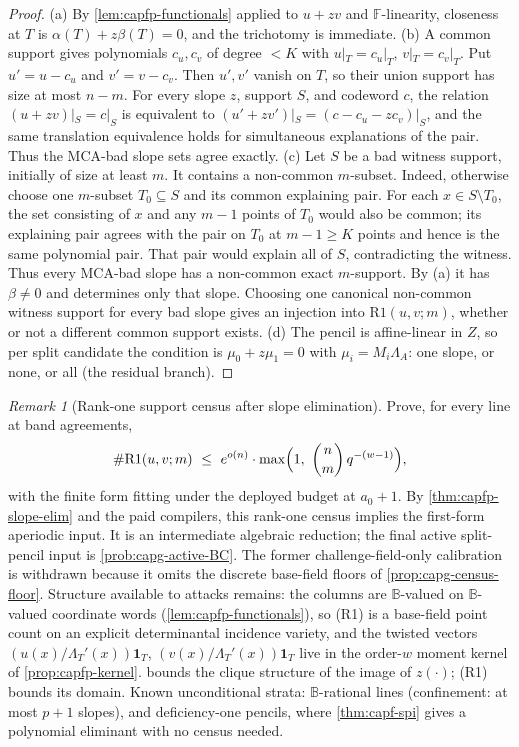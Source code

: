\documentclass[11pt]{article}
\theoremstyle{definition}
\theoremstyle{remark}
\newtheorem{remark}[remark]{Remark}
\newcommand{\F}{\mathbb{F}}
\newcommand{\B}{\mathbb{B}}
\begin{document}
\begin{proof}
\textup{(a)}  By \cref{lem:capfp-functionals} applied to $u+zv$ and $\F$-linearity, closeness at $T$ is $\alpha(T)+z\beta(T)=0$, and the trichotomy is immediate.
\textup{(b)}  A common support gives polynomials $c_u,c_v$ of degree $<K$ with $u|_T=c_u|_T$, $v|_T=c_v|_T$.  Put $u'=u-c_u$ and $v'=v-c_v$.  Then $u',v'$ vanish on $T$, so their union support has size at most $n-m$.  For every slope $z$, support $S$, and codeword $c$, the relation $(u+zv)|_S=c|_S$ is equivalent to $(u'+zv')|_S=(c-c_u-zc_v)|_S$, and the same translation equivalence holds for simultaneous explanations of the pair.  Thus the MCA-bad slope sets agree exactly.
\textup{(c)}  Let $S$ be a bad witness support, initially of size at least
$m$.  It contains a non-common $m$-subset.  Indeed, otherwise choose one
$m$-subset $T_0\subseteq S$ and its common explaining pair.  For each
$x\in S\setminus T_0$, the set consisting of $x$ and any $m-1$ points of
$T_0$ would also be common; its explaining pair agrees with the pair on
$T_0$ at $m-1\ge K$ points and hence is the same polynomial pair.  That pair
would explain all of $S$, contradicting the witness.  Thus every MCA-bad
slope has a non-common exact $m$-support.  By \textup{(a)} it has
$\beta\ne0$ and determines only that slope.  Choosing one canonical
non-common witness support for every bad slope gives an injection into
$\mathrm{R1}(u,v;m)$, whether or not a different common support exists.
\textup{(d)}  The pencil is affine-linear in $Z$, so per split candidate the condition is $\mu_0+z\mu_1=0$ with $\mu_i=M_i\Lambda_A$: one slope, or none, or all \textup(the residual branch\textup).
\end{proof}

\begin{remark}[Rank-one support census after slope elimination]\label{prob:capfp-R1}
Prove, for every line at band agreements,
\[
        \#\mathrm{R1}(u,v;m)\ \le\ e^{o(n)}\cdot\max\Bigl(1,\ \binom nm\,q^{-(w-1)}\Bigr),
\]
with the finite form fitting under the deployed budget at $a_0+1$.  By \cref{thm:capfp-slope-elim} and the paid compilers, this rank-one census implies the first-form aperiodic input.  It is an intermediate algebraic reduction; the final active split-pencil input is \cref{prob:capg-active-BC}.  The former challenge-field-only calibration is withdrawn because it omits the discrete base-field floors of \cref{prop:capg-census-floor}.  Structure available to attacks remains: the columns are $\B$-valued on $\B$-valued coordinate words (\cref{lem:capfp-functionals}), so \textup{(R1)} is a base-field point count on an explicit determinantal incidence variety, and the twisted vectors $(u(x)/\Lambda_T'(x))\mathbf1_T$, $(v(x)/\Lambda_T'(x))\mathbf1_T$ live in the order-$w$ moment kernel of \cref{prop:capfp-kernel}.   bounds the clique structure of the image of $z(\cdot)$; \textup{(R1)} bounds its domain.  Known unconditional strata: $\B$-rational lines \textup(confinement: at most $p+1$ slopes\textup), and deficiency-one pencils, where \cref{thm:capf-spi} gives a polynomial eliminant with no census needed.
\end{remark}
\end{document}
